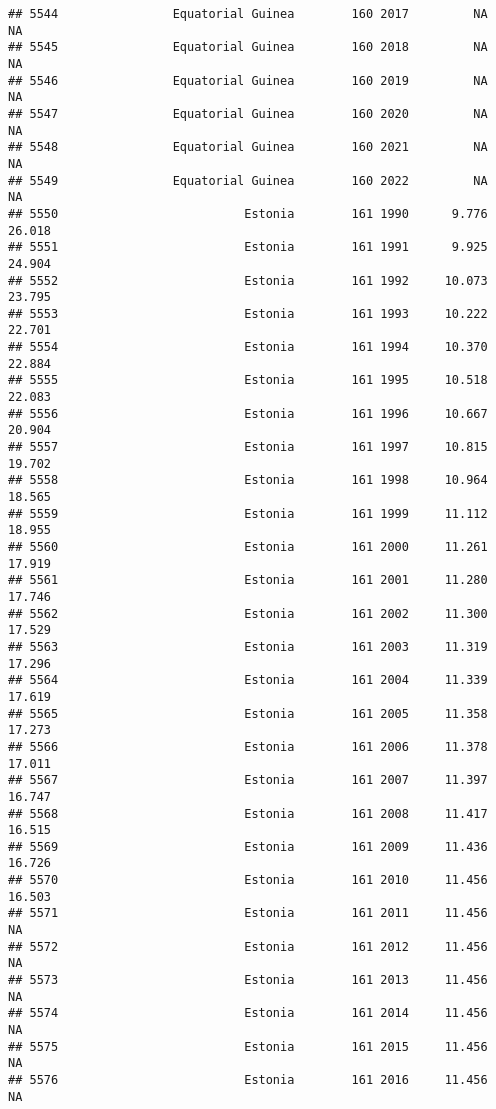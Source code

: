 \documentclass[
]{article}
\begin{document}
\begin{verbatim}
## 5544                Equatorial Guinea        160 2017         NA         NA
## 5545                Equatorial Guinea        160 2018         NA         NA
## 5546                Equatorial Guinea        160 2019         NA         NA
## 5547                Equatorial Guinea        160 2020         NA         NA
## 5548                Equatorial Guinea        160 2021         NA         NA
## 5549                Equatorial Guinea        160 2022         NA         NA
## 5550                          Estonia        161 1990      9.776     26.018
## 5551                          Estonia        161 1991      9.925     24.904
## 5552                          Estonia        161 1992     10.073     23.795
## 5553                          Estonia        161 1993     10.222     22.701
## 5554                          Estonia        161 1994     10.370     22.884
## 5555                          Estonia        161 1995     10.518     22.083
## 5556                          Estonia        161 1996     10.667     20.904
## 5557                          Estonia        161 1997     10.815     19.702
## 5558                          Estonia        161 1998     10.964     18.565
## 5559                          Estonia        161 1999     11.112     18.955
## 5560                          Estonia        161 2000     11.261     17.919
## 5561                          Estonia        161 2001     11.280     17.746
## 5562                          Estonia        161 2002     11.300     17.529
## 5563                          Estonia        161 2003     11.319     17.296
## 5564                          Estonia        161 2004     11.339     17.619
## 5565                          Estonia        161 2005     11.358     17.273
## 5566                          Estonia        161 2006     11.378     17.011
## 5567                          Estonia        161 2007     11.397     16.747
## 5568                          Estonia        161 2008     11.417     16.515
## 5569                          Estonia        161 2009     11.436     16.726
## 5570                          Estonia        161 2010     11.456     16.503
## 5571                          Estonia        161 2011     11.456         NA
## 5572                          Estonia        161 2012     11.456         NA
## 5573                          Estonia        161 2013     11.456         NA
## 5574                          Estonia        161 2014     11.456         NA
## 5575                          Estonia        161 2015     11.456         NA
## 5576                          Estonia        161 2016     11.456         NA

\end{verbatim}
\end{document}
